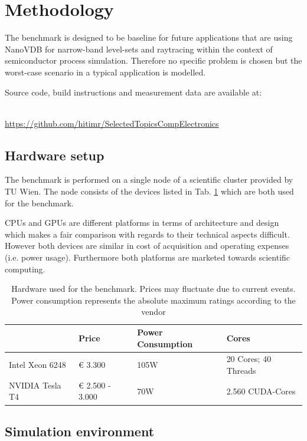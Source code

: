\section{Methodology}
\label{sec:methodology}

The benchmark is designed to be baseline for future applications that are using NanoVDB for narrow-band level-sets and raytracing within the context of semiconductor process simulation.
Therefore no specific problem is chosen but the worst-case scenario in a typical application is modelled.

Source code, build instructions and measurement data are available at:
\\~\\
\centerline{\url{https://github.com/hitimr/SelectedTopicsCompElectronics}}


\subsection{Hardware setup}
The benchmark is performed on a single node of a scientific cluster provided by TU Wien.
The node consists of the devices listed in Tab. \ref{tab:hardware} which are both used for the benchmark.

CPUs and GPUs are different platforms in terms of architecture and design which makes a fair comparison with regards to their technical aspects difficult.
However both devices are similar in cost of acquisition and operating expenses (i.e. power usage).
Furthermore both platforms are marketed towards scientific computing.


\begin{table}[H]
	\caption{Hardware used for the benchmark. Prices may fluctuate due to current events. Power consumption represents the absolute maximum ratings according to the vendor}
	\centering
	\begin{tabular}{@{}llll@{}}
		\toprule
		                & Price           & Power Consumption & Cores                \\ \hline
		Intel Xeon 6248 & € 3.300         & 105W              & 20 Cores; 40 Threads \\
		NVIDIA Tesla T4 & € 2.500 - 3.000 & 70W               & 2.560 CUDA-Cores     \\ \bottomrule
	\end{tabular}
	\label{tab:hardware}
\end{table}


\subsection{Simulation environment}

